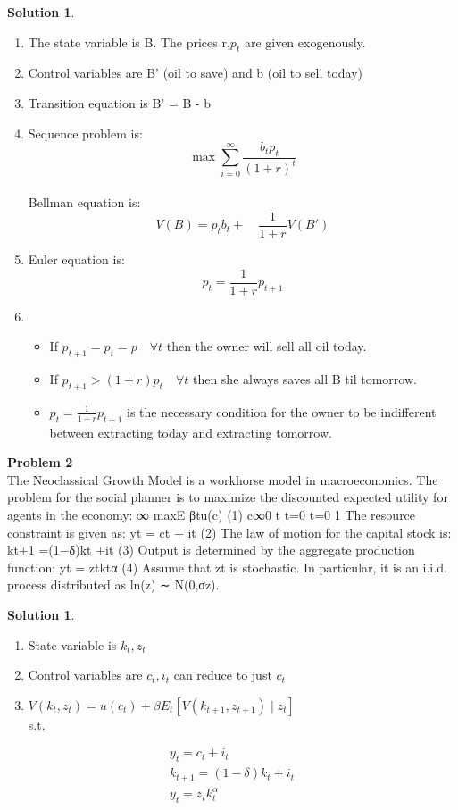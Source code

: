 \documentclass[letterpaper,12pt]{article}
\theoremstyle{definition}
\newtheorem{solution}[theorem]{Solution}
\begin{document}
\begin{solution} ~\\
  \begin{enumerate}
  \item The state variable is B. The prices r,$p_t$ are given exogenously.
  \item Control variables are B' (oil to save) and b (oil to sell today)
  \item Transition equation is B' = B - b
  \item Sequence problem is: \[ \max \sum_{i=0}^\infty \frac{b_tp_t}{(1+r)^t} \] \\
  Bellman equation is:
  \[ V(B) = p_tb_t + \quad \frac{1}{1+r} V(B')\]
  \item Euler equation is: \[ p_t = \frac{1}{1+r}p_{t+1}
  \]
  \item
  \begin{itemize}
    \item If $p_{t+1}=p_t=p \quad \forall t$ then the owner will sell all oil today.
    \item If $p_{t+1} > (1+r) p_t \quad \forall t$ then she always saves all B til tomorrow.
    \item $p_t = \frac{1}{1+r}p_{t+1}$ is the necessary condition for the owner to be indifferent between extracting today and extracting tomorrow.
  \end{itemize}
  \end{enumerate}
\end{solution}

\noindent\textbf{Problem 2} ~\\
The Neoclassical Growth Model is a workhorse model in macroeconomics. The problem for the social planner is to maximize the discounted expected utility for agents in the economy:
∞
 maxE  βtu(c) (1) {c}∞0 t
t=0 t=0 1
The resource constraint is given as:
yt = ct + it (2) The law of motion for the capital stock is:
kt+1 =(1−δ)kt +it (3) Output is determined by the aggregate production function:
yt = ztktα (4) Assume that zt is stochastic. In particular, it is an i.i.d. process distributed as ln(z) ∼
N(0,σz).

\begin{solution} ~\\
  \begin{enumerate}
  \item State variable is $k_t, z_t$
  \item Control variables are $c_t,i_t$ can reduce to just $c_t$
  \item $V(k_t,z_t) = u(c_t) + \beta E_t[V(k_{t+1},z_{t+1}) \mid z_{t}]$ \\ s.t.
  \end{enumerate}
  \begin{gather}
    y_t = c_t + i_t \\
    k_{t+1} = (1- \delta)k_t + i_t \\
    y_t = z_tk_t^\alpha
  \end{gather}
\end{solution}
\end{document}
